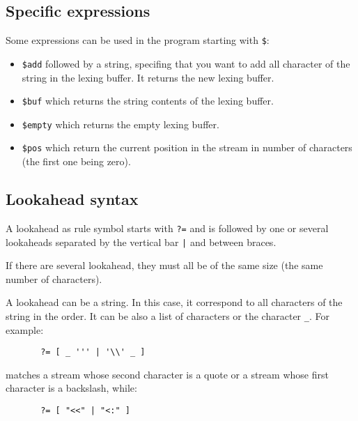 \documentclass[11pt]{article}
\begin{document}
\subsection{Specific expressions}

Some expressions can be used in the program starting with \verb/$/:

\begin{itemize}

\item \verb/$add/ followed by a string, specifing that you want to add
  all character of the string in the lexing buffer. It returns the new
  lexing buffer.

\item \verb/$buf/ which returns the string contents of the lexing buffer.

\item \verb/$empty/ which returns the empty lexing buffer.

\item \verb/$pos/ which return the current position in the stream in
  number of characters (the first one being zero).

\end{itemize}

\subsection{Lookahead syntax}

A lookahead as rule symbol starts with \verb/?=/ and is followed by
one or several lookaheads separated by the vertical bar \verb/|/ and
between braces.

If there are several lookahead, they must all be of the same size (the
same number of characters).

A lookahead can be a string. In this case, it correspond to all characters
of the string in the order. It can be also a list of characters or the
character \verb/_/. For example:

\begin{verbatim}
       ?= [ _ ''' | '\\' _ ]
\end{verbatim}

matches a stream whose second character is a quote or a stream whose
first character is a backslash, while:

\begin{verbatim}
       ?= [ "<<" | "<:" ]
\end{verbatim}
\end{document}

